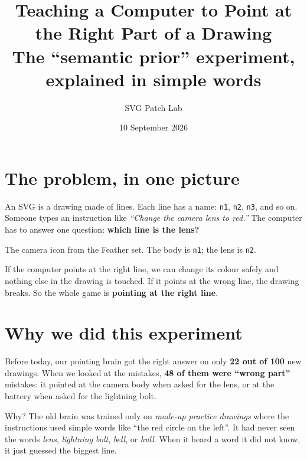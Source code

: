 \documentclass[11pt,a4paper]{article}
\title{\Huge Teaching a Computer to Point at the Right Part of a Drawing\\[6pt]
\Large The ``semantic prior'' experiment, explained in simple words}
\author{SVG Patch Lab}
\date{10 September 2026}
\begin{document}
\maketitle

\section*{The problem, in one picture}

An SVG is a drawing made of lines. Each line has a name: \texttt{n1}, \texttt{n2}, \texttt{n3}, and so on.
Someone types an instruction like \emph{``Change the camera lens to red.''}
The computer has to answer one question: \textbf{which line is the lens?}

\begin{center}

\small The camera icon from the Feather set. The body is \texttt{n1}; the lens is \texttt{n2}.
\end{center}

If the computer points at the right line, we can change its colour safely and nothing else in the drawing is touched.
If it points at the wrong line, the drawing breaks.
So the whole game is \textbf{pointing at the right line}.

\section*{Why we did this experiment}

Before today, our pointing brain got the right answer on only \textbf{22 out of 100} new drawings.
When we looked at the mistakes, \textbf{48 of them were ``wrong part''} mistakes: it pointed at the camera body when asked for the lens, or at the battery when asked for the lightning bolt.

Why? The old brain was trained only on \emph{made-up practice drawings} where the instructions used simple words like ``the red circle on the left''.
It had never seen the words \emph{lens}, \emph{lightning bolt}, \emph{bell}, or \emph{hull}.
When it heard a word it did not know, it just guessed the biggest line.
\end{document}

